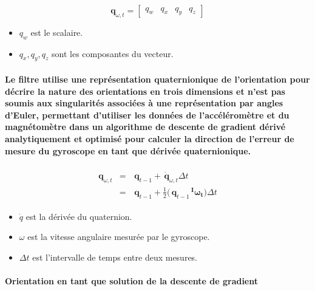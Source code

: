 \begin{equation}
	\mathbf{q}_{\omega, t}=\begin{bmatrix}q_w & q_x & q_y & q_z\end{bmatrix}
\end{equation}

\begin{itemize}
	\item $q_w$ est le scalaire.
	\item $q_x, q_y, q_z$ sont les composantes du vecteur.
\end{itemize}

\paragraph{Le filtre utilise une représentation quaternionique de l'orientation pour décrire la nature des orientations en trois dimensions et n'est pas soumis aux singularités associées à une représentation par angles d'Euler, permettant d'utiliser les données de l'accéléromètre et du magnétomètre dans un algorithme de descente de gradient dérivé analytiquement et optimisé pour calculer la direction de l'erreur de mesure du gyroscope en tant que dérivée quaternionique.}

\begin{equation}
	\begin{split}\begin{array}{rcl}
		\mathbf{q}_{\omega, t} &=& \,\mathbf{q}_{t-1} + \,\dot{\mathbf{q}}_{\omega, t}\Delta t\\
		&=& \,\mathbf{q}_{t-1} + \frac{1}{2}\big(\,\mathbf{q}_{t-1}\mathbf{\,^I\omega_t}\big)\Delta t
	\end{array}\end{split}
\end{equation}


\begin{itemize}
	\item $\dot{q}$ est la dérivée du quaternion.
	\item $\omega$ est la vitesse angulaire mesurée par le gyroscope.
	\item $\Delta t$ est l'intervalle de temps entre deux mesures.
\end{itemize}

\paragraph{Orientation en tant que solution de la descente de gradient}

